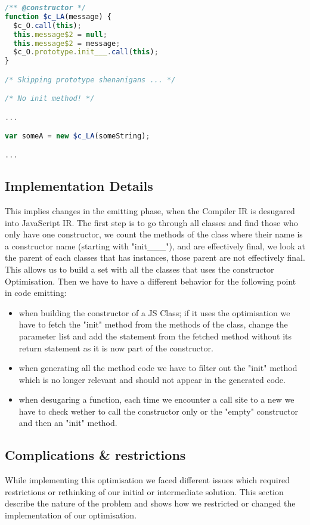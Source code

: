 \begin{lstlisting}[language=javascript,caption=Generated JavaScript with
constructor optimisation., label={lst:ctorOptJS}]
/** @constructor */
function $c_LA(message) {
  $c_O.call(this);
  this.message$2 = null;
  this.message$2 = message;
  $c_O.prototype.init___.call(this);
}

/* Skipping prototype shenanigans ... */

/* No init method! */

...

var someA = new $c_LA(someString);

...

\end{lstlisting}

\subsection{Implementation Details}
This implies changes in the emitting phase, when the Compiler IR is desugared
into JavaScript IR. The first step is to go through all classes and find those
who only have one constructor, we count the methods of the class where their
name is a constructor name (starting with "init\_\_\_"), and are effectively
final, we look at the parent of each classes that has instances, those parent
are not effectively final. This allows us to build a set with all the classes
that uses the constructor Optimisation. Then we have to have a different
behavior for the following point in code emitting:
\begin{itemize}
\item when building the constructor of a JS Class; if it uses the optimisation
we have to fetch the "init" method from the methods of the class, change the
parameter list and add the statement from the fetched method without its return
statement as it is now part of the constructor.
\item when generating all the method code we have to filter out the "init"
method which is no longer relevant and should not appear in the generated code.
\item when desugaring a function, each time we encounter a call site to a new
we have to check wether to call the constructor only or the "empty" constructor
and then an "init" method.
\end{itemize}

\subsection{Complications \& restrictions}
While implementing this optimisation we faced different issues which required
restrictions or rethinking of our initial or intermediate solution. This
section describe the nature of the problem and shows how we restricted or
changed the implementation of our optimisation.
